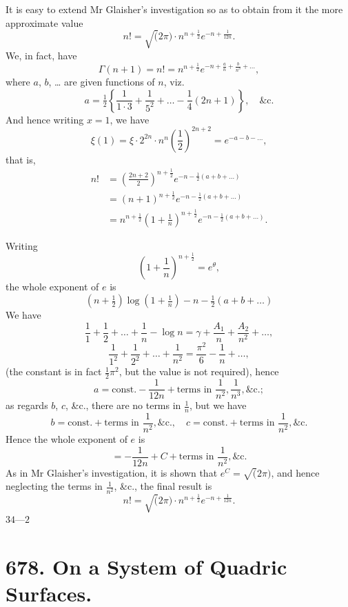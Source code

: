 \documentclass[12pt,a4paper]{article}
\theoremstyle{cayley}
\theoremstyle{definition}
\numberwithin{equation}{section}
\begin{document}
It is easy to extend Mr Glaisher's investigation so as to obtain from it the more approximate value
\[
n! = \surd(2\pi) \cdot n^{n+\frac{1}{2}} e^{-n + \frac{1}{12n}}.
\]
We, in fact, have
\[
\Gamma(n + 1) = n! = n^{n+\frac{1}{2}} e^{-n + \frac{a}{n} + \frac{b}{n^3} + \ldots},
\]
where $a$, $b$, \dots{} are given functions of $n$, viz.
\[
a = \tfrac{1}{2} \left\{\frac{1}{1 \cdot 3} + \frac{1}{5^2} + \ldots - \frac{1}{4}(2n + 1)\right\}, \quad \text{\&c.}
\]
And hence writing $x = 1$, we have
\[
\xi(1) = \xi \cdot 2^{2n} \cdot n^n \left(\frac{1}{2}\right)^{2n+2} = e^{-a - b - \ldots},
\]
that is,
\begin{align*}
n! &= \left(\frac{2n + 2}{2}\right)^{n+\frac{1}{2}} e^{-n - \frac{1}{2}(a + b + \ldots)} \\
&= (n + 1)^{n+\frac{1}{2}} e^{-n - \frac{1}{2}(a + b + \ldots)} \\
&= n^{n+\frac{1}{2}} \left(1 + \frac{1}{n}\right)^{n+\frac{1}{2}} e^{-n - \frac{1}{2}(a + b + \ldots)}.
\end{align*}

Writing
\[
\left(1 + \frac{1}{n}\right)^{n+\frac{1}{2}} = e^{\theta},
\]
the whole exponent of $e$ is
\[
(n + \tfrac{1}{2}) \log(1 + \tfrac{1}{n}) - n - \tfrac{1}{2}(a + b + \ldots)
\]
We have
\[
\frac{1}{1} + \frac{1}{2} + \ldots + \frac{1}{n} - \log n = \gamma + \frac{A_1}{n} + \frac{A_2}{n^2} + \ldots,
\]
\[
\frac{1}{1^2} + \frac{1}{2^2} + \ldots + \frac{1}{n^2} = \frac{\pi^2}{6} - \frac{1}{n} + \ldots,
\]
(the constant is in fact $\frac{1}{2}\pi^2$, but the value is not required), hence
\[
a = \text{const.} - \frac{1}{12n} + \text{terms in } \frac{1}{n^2}, \frac{1}{n^3}, \text{\&c.};
\]
as regards $b$, $c$, \&c., there are no terms in $\frac{1}{n}$, but we have
\[
b = \text{const.} + \text{terms in } \frac{1}{n^2}, \text{\&c.}, \quad c = \text{const.} + \text{terms in } \frac{1}{n^2}, \text{\&c.}
\]
Hence the whole exponent of $e$ is
\[
= -\frac{1}{12n} + C + \text{terms in } \frac{1}{n^2}, \text{\&c.}
\]
As in Mr Glaisher's investigation, it is shown that $e^C = \surd(2\pi)$, and hence neglecting the terms in $\frac{1}{n^2}$, \&c., the final result is
\[
n! = \surd(2\pi) \cdot n^{n+\frac{1}{2}} e^{-n + \frac{1}{12n}}.
\]
\hfill $34\text{---}2$

\newpage

\section*{678. On a System of Quadric Surfaces.}
\end{document}
